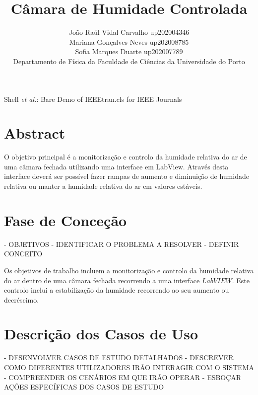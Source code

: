 \documentclass[journal]{IEEEtran}
\begin{document}
\title{Câmara de Humidade Controlada}

\author{João Raúl Vidal Carvalho up202004346 \\ Mariana Gonçalves Neves up202008785 \\ Sofia Marques Duarte up202007789 \\ Departamento de Física da Faculdade de Ciências da Universidade do Porto}

%
{Shell \MakeLowercase{\textit{et al.}}: Bare Demo of IEEEtran.cls for IEEE Journals}

\maketitle

\section{Abstract}

O objetivo principal é a monitorização e controlo da humidade relativa do ar de uma câmara fechada utilizando uma interface em LabView. Através desta interface deverá ser possível fazer rampas de aumento e diminuição de humidade relativa ou manter a humidade relativa do ar em valores estáveis. 




\section{Fase de Conceção}

- OBJETIVOS
- IDENTIFICAR O PROBLEMA A RESOLVER
- DEFINIR CONCEITO


Os objetivos de trabalho incluem a monitorização e controlo da humidade relativa do ar dentro de uma câmara fechada recorrendo a uma interface $LabVIEW$. Este controlo inclui a estabilização da humidade recorrendo ao seu aumento ou decréscimo.





\section{Descrição dos Casos de Uso}

- DESENVOLVER CASOS DE ESTUDO DETALHADOS
- DESCREVER COMO DIFERENTES UTILIZADORES IRÃO INTERAGIR COM O SISTEMA
- COMPREENDER OS CENÁRIOS EM QUE IRÃO OPERAR
- ESBOÇAR AÇÕES ESPECÍFICAS DOS CASOS DE ESTUDO 
\end{document}
